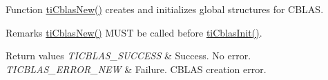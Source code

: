 Function \hyperlink{group__ti__cblas__api_gad9c3d0709709d5c3303988e3616fb205}{ti\+Cblas\+New()} creates and initializes global structures for C\+B\+L\+A\+S. 

\begin{DoxyRemark}{Remarks}
\hyperlink{group__ti__cblas__api_gad9c3d0709709d5c3303988e3616fb205}{ti\+Cblas\+New()} M\+U\+S\+T be called before \hyperlink{group__ti__cblas__api_ga4757d903bc3509fd5c328317c9a72dd7}{ti\+Cblas\+Init()}.
\end{DoxyRemark}

\begin{DoxyRetVals}{Return values}
{\em T\+I\+C\+B\+L\+A\+S\+\_\+\+S\+U\+C\+C\+E\+S\+S} & Success. No error. \\
\hline
{\em T\+I\+C\+B\+L\+A\+S\+\_\+\+E\+R\+R\+O\+R\+\_\+\+N\+E\+W} & Failure. C\+B\+L\+A\+S creation error. \\
\hline
\end{DoxyRetVals}
